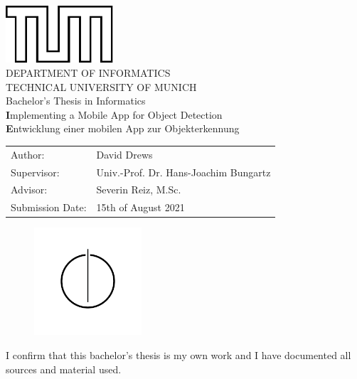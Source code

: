 \documentclass[
			   fontsize=11pt,
               paper=a4,
               bibliography=totoc,
               idxtotoc,
               headsepline,
               footsepline,
               footinclude=false,
               BCOR=12mm,
               DIV=13,
               openany,   %
               ]
               {scrbook}
\def\doctype{Bachelor's Thesis\xspace}
\def\studyProgram{Informatics}
\def\title{Implementing a Mobile App for Object Detection}
\def\titleGer{Entwicklung einer mobilen App zur Objekterkennung}
\def\author{David Drews}
\def\supervisor{Univ.-Prof. Dr. Hans-Joachim Bungartz}
\def\advisor{Severin Reiz, M.Sc.}
\def\date{15th of August 2021}
\begin{document}
\def\bcorcor{0.15cm}
\addtolength{\hoffset}{\bcorcor}
\thispagestyle{empty}
\vspace{10mm}
\begin{center}
    \includegraphics[width=4cm]{templateStuff/tumlogo.pdf}\\[5mm]
	\huge DEPARTMENT OF INFORMATICS\\[5mm]
	\large TECHNICAL UNIVERSITY OF MUNICH\\[24mm]
	{\Large \doctype in \studyProgram}\\[20mm]
	{\LARGE\textbf \title}\\[10mm]
	{\LARGE\textbf \titleGer}\\[10mm]
	\begin{tabular}{ll}
		\Large Author:      	& \Large \author \\[2mm]
		\Large Supervisor:  	& \Large \supervisor\\[2mm]
		\Large Advisor:			& \Large \advisor\\[2mm]
		\Large Submission Date:       		& \Large \date
	\end{tabular}
	\vspace{-1mm}
	\begin{figure}[h!]
		\centering
		\includegraphics[width=4cm]{templateStuff/informat.pdf}
	\end{figure}
\end{center}

\addtolength{\hoffset}{\bcorcor}
\newpage


\cleardoubleemptypage

\thispagestyle{empty}
\vspace*{0.7\textheight}
\noindent
I confirm that this \MakeLowercase{\doctype} is my own work and I have documented all sources and material used.\\
\end{document}

